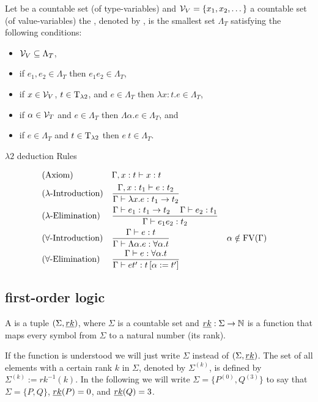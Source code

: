 \begin{definition}
Let \lambdaTypVar{} be a countable set (of type-variables) and $\mathcal{V}_V=\{x_1,x_2,\dots\}$ a countable set (of value-variables) the , denoted by \lambdaTerms{}, is the smallest set $\Lambda_T$ satisfying the following conditions: %
\begin{itemize}
\item $\mathcal{V}_V\subseteq\Lambda_T$,
\item if $e_1,e_2\in\Lambda_T$ then $e_1e_2\in\Lambda_T$,
\item if $x\in\mathcal{V}_V$, $t\in\text{T}_{\lambda2}$, and $e\in\Lambda_T$ then $\lambda x:t.e\in\Lambda_T$,
\item if $\alpha\in\mathcal{V}_T$ and $e\in\Lambda_T$ then $\Lambda \alpha.e\in\Lambda_T$, and
\item if $e\in\Lambda_T$ and $t\in\text{T}_{\lambda2}$ then $e\:t\in\Lambda_T$.
\end{itemize}
\end{definition}
$\lambda2$ deduction Rules
\begin{mdframed}
\begingroup
\addtolength{\jot}{0.3cm}
\begin{align*}
&(\text{Axiom}) &&\Gamma,x:t\vdash x:t\\
&(\lambda\text{-Introduction}) &&\frac{\Gamma,x:t_1\vdash e:t_2}{\Gamma\vdash \lambda x.e:t_1\to t_2}\\
&(\lambda\text{-Elimination}) &&\frac{\Gamma\vdash e_1:t_1\to t_2 \hspace{0.4cm}\Gamma\vdash e_2:t_1}{\Gamma\vdash e_1e_2:t_2}\\
&(\forall\text{-Introduction}) &&\frac{\Gamma\vdash e:t}{\Gamma\vdash \Lambda\alpha.e:\forall\alpha.t} &&\alpha\notin\text{FV}(\Gamma) \\
&(\forall\text{-Elimination}) &&\frac{\Gamma\vdash e:\forall\alpha.t }{\Gamma\vdash et':t\left[ \alpha:=t'\right] }
\end{align*}
\endgroup
\end{mdframed}

\subsection{first-order logic}
\begin{definition}
A  is a tuple $(\Sigma,\emph{rk})$, where $\Sigma$ is a countable set and $\emph{rk}:\Sigma\to\mathbb{N}$ is a function that maps every symbol from $\Sigma$ to a natural number (its rank).
\end{definition}
If the function \rank{} is understood we will just write $\Sigma$ instead of $(\Sigma,\emph{rk})$. The set of all elements with a certain rank $k$ in $\Sigma$, denoted by $\Sigma^{(k)}$, is defined by $\Sigma^{(k)}:=rk^{-1}(k)$. In the following we will write $\Sigma=\{P^{(0)},Q^{(3)}\}$ to say that $\Sigma=\{P,Q\}$, $\emph{rk}(P)=0$, and $\emph{rk}(Q)=3$.

